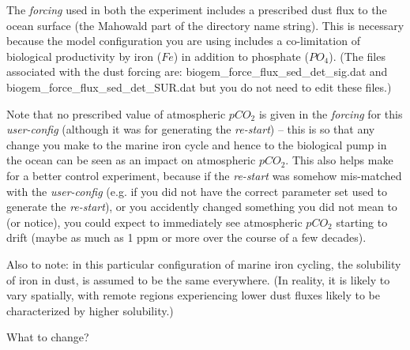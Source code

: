 \documentclass[11pt,fleqn]{book} %
\begin{document}
The \textit{forcing} used in both the experiment includes a prescribed dust flux to the ocean surface (the \textsf{\footnotesize Mahowald} part of the directory name string). This is necessary because the model configuration you are using includes a co-limitation of biological productivity by iron (\(Fe\)) in addition to phosphate (\(PO_{4}\)). (The files associated with the dust forcing are: \textsf{\footnotesize biogem\_force\_flux\_sed\_det\_sig.dat} and \textsf{\footnotesize biogem\_force\_flux\_sed\_det\_SUR.dat} but you do not need to edit these files.) 

Note that no prescribed value of atmospheric \(pCO_{2}\) is given in the \textit{forcing} for this \textit{user-config} (although it was for generating the \textit{re-start}) -- this is so that any change you make to the marine iron cycle and hence to the biological pump in the ocean can be seen as an impact on atmospheric \(pCO_{2}\). This also helps make for a better control experiment, because if the \textit{re-start} was somehow mis-matched with the \textit{user-config} (e.g. if you did not have the correct parameter set used to generate the \textit{re-start}), or you accidently changed something you did not mean to (or notice), you could expect to immediately see atmospheric \(pCO_{2}\) starting to drift (maybe as much as 1 ppm or more over the course of a few decades).

Also to note: in this particular configuration of marine iron cycling, the solubility of iron in dust, is assumed to be the same everywhere. (In reality, it is likely to vary spatially, with remote regions experiencing lower dust fluxes likely to be characterized by higher solubility.)

\vspace{1mm}
What to change?
\end{document}
